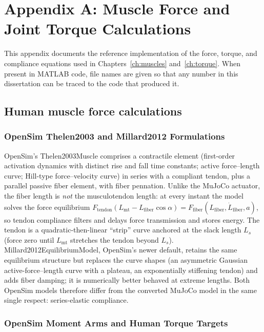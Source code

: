 \chapter{Appendix A: Muscle Force and Joint Torque Calculations}\label{app:muscle_calcs}
\graphicspath{{D:/Github/Bipedal_Robot/Documentation/Reports and Papers/Dissertation/Figures/92-AppendixA/}{figs/92-AppendixA/}}

This appendix documents the reference implementation of the force, torque, and compliance equations used in Chapters~\ref{ch:muscles} and~\ref{ch:torque}. When present in MATLAB code, file names are given so that any number in this dissertation can be traced to the code that produced it.

\section{Human muscle force calculations}
\subsection{OpenSim Thelen2003 and Millard2012 Formulations}

OpenSim's Thelen2003Muscle comprises a contractile element (first-order
activation dynamics with distinct rise and fall time constants; active
force--length curve; Hill-type force--velocity
curve) in series with a compliant tendon, plus a parallel passive fiber
element, with fiber pennation. Unlike the MuJoCo actuator, the fiber
length is \emph{not} the musculotendon length: at every instant the
model solves the force equilibrium
$F_{\text{tendon}}(L_{\text{mt}} - L_{\text{fiber}}\cos\alpha)
 = F_{\text{fiber}}(L_{\text{fiber}}, \dot{L}_{\text{fiber}}, a)$,
so tendon compliance filters and delays force transmission and stores
energy. The tendon is a quadratic-then-linear ``strip'' curve anchored
at the slack length $L_s$ (force zero until $L_{\text{mt}}$ stretches
the tendon beyond $L_s$). Millard2012EquilibriumModel, OpenSim's newer
default, retains the same equilibrium structure but replaces the curve
shapes (an asymmetric Gaussian active-force--length curve with a
plateau, an exponentially stiffening tendon) and adds fiber damping; it
is numerically better behaved at extreme lengths. Both OpenSim models
therefore differ from the converted MuJoCo model in the same single
respect: series-elastic compliance.

\subsection{OpenSim Moment Arms and Human Torque Targets}
\label{sec:app_opensim_targets}

